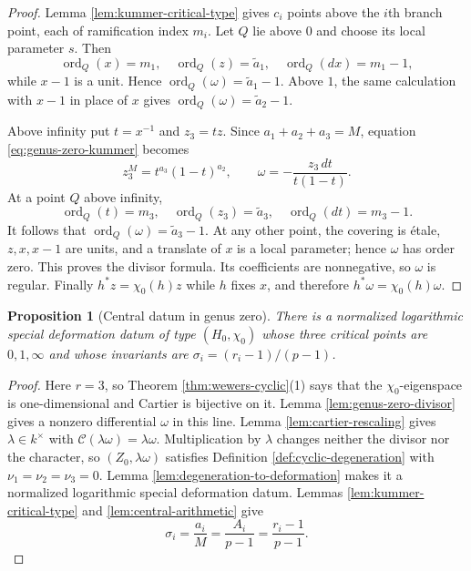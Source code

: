 \documentclass[10pt,a4paper]{amsart}
\newtheorem{proposition}[theorem]{Proposition}
\numberwithin{equation}{section}
\begin{document}
\begin{proof}
Lemma \ref{lem:kummer-critical-type} gives $c_i$ points above the $i$th
branch point, each of ramification index $m_i$.  Let $Q$ lie above $0$ and
choose its local parameter $s$.  Then
\[
 \operatorname{ord}_Q(x)=m_1,\quad
 \operatorname{ord}_Q(z)=\widetilde a_1,\quad
 \operatorname{ord}_Q(dx)=m_1-1,
\]
while $x-1$ is a unit.  Hence
$\operatorname{ord}_Q(\omega)=\widetilde a_1-1$.  Above $1$, the same
calculation with $x-1$ in place of $x$ gives
$\operatorname{ord}_Q(\omega)=\widetilde a_2-1$.

Above infinity put $t=x^{-1}$ and $z_3=tz$.  Since
$a_1+a_2+a_3=M$, equation \eqref{eq:genus-zero-kummer} becomes
\[
 z_3^M=t^{a_3}(1-t)^{a_2},
 \qquad
 \omega=-\frac{z_3\,dt}{t(1-t)}.
\]
At a point $Q$ above infinity,
\[
 \operatorname{ord}_Q(t)=m_3,\quad
 \operatorname{ord}_Q(z_3)=\widetilde a_3,\quad
 \operatorname{ord}_Q(dt)=m_3-1.
\]
It follows that $\operatorname{ord}_Q(\omega)=\widetilde a_3-1$.  At any
other point, the covering is \'etale, $z,x,x-1$ are units, and a translate
of $x$ is a local parameter; hence $\omega$ has order zero.  This proves
the divisor formula.  Its coefficients are nonnegative, so $\omega$ is
regular.  Finally $h^*z=\chi_0(h)z$ while $h$ fixes $x$, and therefore
$h^*\omega=\chi_0(h)\omega$.
\end{proof}

\begin{proposition}[Central datum in genus zero]
\label{prop:central-genus-zero}
There is a normalized logarithmic special deformation datum of type
$(H_0,\chi_0)$ whose three critical points are $0,1,\infty$ and whose
invariants are $\sigma_i=(r_i-1)/(p-1)$.
\end{proposition}

\begin{proof}
Here $r=3$, so Theorem \ref{thm:wewers-cyclic}(1) says that the
$\chi_0$-eigenspace is one-dimensional and Cartier is bijective on it.
Lemma \ref{lem:genus-zero-divisor} gives a nonzero differential $\omega$ in
this line.  Lemma \ref{lem:cartier-rescaling} gives $\lambda\in k^\times$
with $\mathcal C(\lambda\omega)=\lambda\omega$.  Multiplication by
$\lambda$ changes neither the divisor nor the character, so
$(Z_0,\lambda\omega)$ satisfies Definition
\ref{def:cyclic-degeneration} with $\nu_1=\nu_2=\nu_3=0$.  Lemma
\ref{lem:degeneration-to-deformation} makes it a normalized logarithmic
special deformation datum.  Lemmas \ref{lem:kummer-critical-type} and
\ref{lem:central-arithmetic} give
\[
 \sigma_i=\frac{a_i}{M}=\frac{A_i}{p-1}
 =\frac{r_i-1}{p-1}.
\]
\end{proof}
\end{document}
